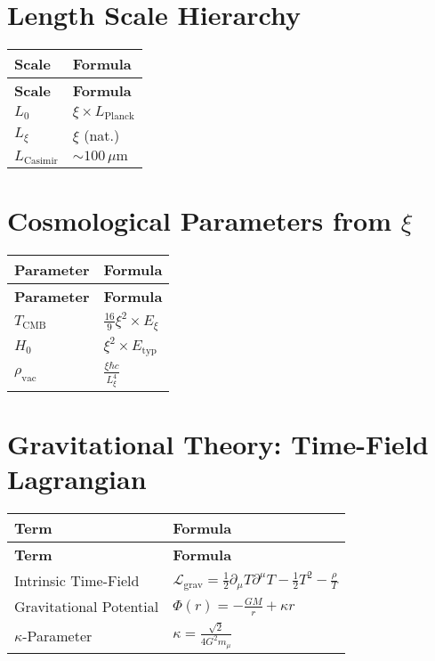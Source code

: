 \documentclass[12pt,a4paper]{article}
\begin{document}
	\section{Length Scale Hierarchy}
	\begin{longtable}{|p{5cm}|p{6cm}|}
		\hline
		\textbf{Scale} & \textbf{Formula} \\
		\hline
		\endfirsthead
		\hline
		\textbf{Scale} & \textbf{Formula} \\
		\hline
		\endhead
		$L_0$ & $\xi \times L_{\text{Planck}}$ \\
		\hline
		$L_{\xi}$ & $\xi$ (nat.) \\
		\hline
		$L_{\text{Casimir}}$ & $\sim 100 \, \mu\text{m}$ \\
		\hline
	\end{longtable}
	
	\section{Cosmological Parameters from $\xi$}
	\begin{longtable}{|p{5cm}|p{6cm}|}
		\hline
		\textbf{Parameter} & \textbf{Formula} \\
		\hline
		\endfirsthead
		\hline
		\textbf{Parameter} & \textbf{Formula} \\
		\hline
		\endhead
		$T_{\text{CMB}}$ & $\frac{16}{9}\xi^{2} \times E_{\xi}$ \\
		\hline
		$H_0$ & $\xi^{2} \times E_{\text{typ}}$ \\
		\hline
		$\rho_{\text{vac}}$ & $\frac{\xi\hbar c}{L_{\xi}^{4}}$ \\
		\hline
	\end{longtable}
	
	\section{Gravitational Theory: Time-Field Lagrangian}
	\begin{longtable}{|p{5cm}|p{6cm}|}
		\hline
		\textbf{Term} & \textbf{Formula} \\
		\hline
		\endfirsthead
		\hline
		\textbf{Term} & \textbf{Formula} \\
		\hline
		\endhead
		Intrinsic Time-Field & $\mathcal{L}_{\text{grav}} = \frac{1}{2}\partial_{\mu}T\partial^{\mu}T - \frac{1}{2}T^{2} - \frac{\rho}{T}$ \\
		\hline
		Gravitational Potential & $\Phi(r) = -\frac{GM}{r} + \kappa r$ \\
		\hline
		$\kappa$-Parameter & $\kappa = \frac{\sqrt{2}}{4G^{2}m_{\mu}}$ \\
		\hline
	\end{longtable}
	
\end{document}
